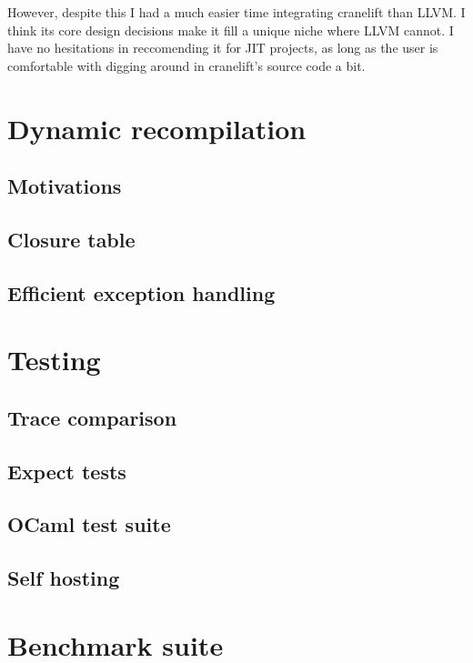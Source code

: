 However, despite this I had a much easier time integrating cranelift than LLVM. I think its core
design decisions make it fill a unique niche where LLVM cannot. I have no hesitations in
reccomending it for JIT projects, as long as the user is comfortable with digging around in
cranelift's source code a bit.

\section{Dynamic recompilation} \label{dyn-recomp}

\subsection{Motivations}

\subsection{Closure table}

\subsection{Efficient exception handling}

\section{Testing}

\subsection{Trace comparison}

\subsection{Expect tests}

\subsection{OCaml test suite}

\subsection{Self hosting}

\section{Benchmark suite}

